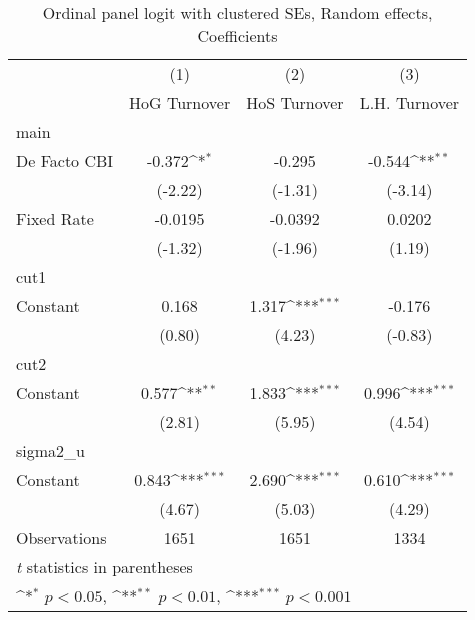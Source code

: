 \begin{table}[htbp]\centering
\def\sym#1{\ifmmode^{#1}\else\(^{#1}\)\fi}
\caption{Ordinal panel logit with clustered SEs, Random effects, Coefficients \label{coeffordLogDF}}
\begin{tabular}{l*{3}{c}}
\toprule
                                        &\multicolumn{1}{c}{(1)}&\multicolumn{1}{c}{(2)}&\multicolumn{1}{c}{(3)}\\
                                        &\multicolumn{1}{c}{HoG Turnover}&\multicolumn{1}{c}{HoS Turnover}&\multicolumn{1}{c}{L.H. Turnover}\\
\midrule
main                                    &                  &                  &                  \\
De Facto CBI                            &   -0.372\sym{*}  &   -0.295         &   -0.544\sym{**} \\
                                        &  (-2.22)         &  (-1.31)         &  (-3.14)         \\
\addlinespace
Fixed Rate                              &  -0.0195         &  -0.0392         &   0.0202         \\
                                        &  (-1.32)         &  (-1.96)         &   (1.19)         \\
\midrule
cut1                                    &                  &                  &                  \\
Constant                                &    0.168         &    1.317\sym{***}&   -0.176         \\
                                        &   (0.80)         &   (4.23)         &  (-0.83)         \\
\midrule
cut2                                    &                  &                  &                  \\
Constant                                &    0.577\sym{**} &    1.833\sym{***}&    0.996\sym{***}\\
                                        &   (2.81)         &   (5.95)         &   (4.54)         \\
\midrule
sigma2\_u                                &                  &                  &                  \\
Constant                                &    0.843\sym{***}&    2.690\sym{***}&    0.610\sym{***}\\
                                        &   (4.67)         &   (5.03)         &   (4.29)         \\
\midrule
Observations                            &     1651         &     1651         &     1334         \\
\bottomrule
\multicolumn{4}{l}{\footnotesize \textit{t} statistics in parentheses}\\
\multicolumn{4}{l}{\footnotesize \sym{*} \(p<0.05\), \sym{**} \(p<0.01\), \sym{***} \(p<0.001\)}\\
\end{tabular}
\end{table}
